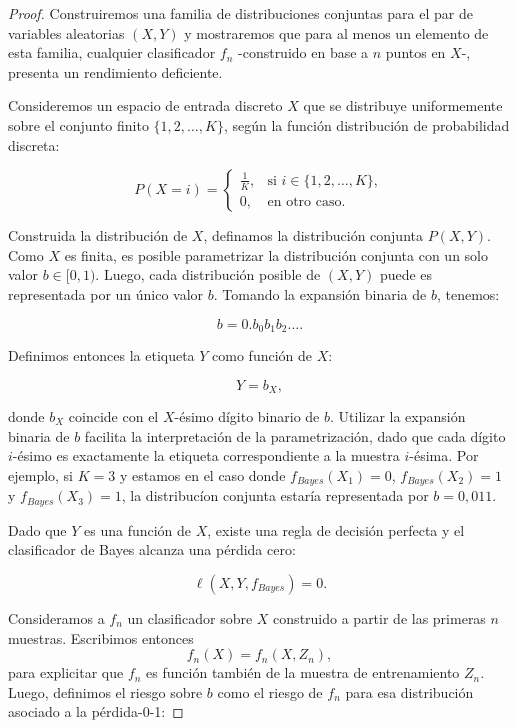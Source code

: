 \documentclass{report}
\begin{document}
\begin{proof}

Construiremos una familia de distribuciones conjuntas para el par de variables aleatorias \((X, Y)\) y mostraremos que para al menos un 
elemento de esta familia, cualquier clasificador \(f_n\) -construido en base a $n$ puntos en $X$-, presenta un rendimiento deficiente.\newline

Consideremos un espacio de entrada 
discreto \(X\) que se distribuye uniformemente sobre el conjunto finito \(\{1, 2, \dots, K\}\), 
según la función distribución de probabilidad discreta:

\[
P(X = i) = \begin{cases} 
\frac{1}{K}, & \text{si } i \in \{1, 2, \dots, K\}, \\ 
0, & \text{en otro caso}.
\end{cases}
\]


Construida la distribución de \(X\), definamos la distribución conjunta \(P(X,Y)\). Como \(X\) es finita,
es posible parametrizar la distribución conjunta con un solo valor
\(b \in [0,1)\). Luego, cada distribución posible de $(X,Y)$ puede es representada por un único valor \(b\).
Tomando la expansión binaria de $b$, tenemos:

\[
b = 0.b_0 b_1 b_2 \dots.
\]

Definimos entonces la etiqueta \(Y\) como función de \(X\):

\[
Y = b_X,
\]

donde \(b_X\) coincide con el \(X\)-ésimo dígito binario de \(b\). Utilizar la expansión binaria de $b$ facilita la interpretación
de la parametrización, dado que cada dígito $i$-ésimo es exactamente la etiqueta correspondiente a la muestra $i$-ésima.
Por ejemplo, si \(K=3\) y estamos en el caso donde  \(f_{Bayes}(X_1)=0\),  \(f_{Bayes}(X_2)=1\) y \(f_{Bayes}(X_3)=1\), 
la distribucíon conjunta estaría representada por $b=0,011$.\newline


Dado que \(Y\) es una función de \(X\), existe una regla de decisión perfecta y el clasificador de Bayes alcanza una pérdida cero:

\[
\ell(X,Y,f_{Bayes}) = 0.
\]

Consideramos a $f_n$ un clasificador sobre $X$ construido a partir de las primeras $n$ muestras. Escribimos entonces
\[
f_n(X) = f_n(X, Z_n),
\]
para explicitar que $f_n$ es función también de la muestra de entrenamiento $Z_n$. Luego, definimos el riesgo sobre \(b\)
como el riesgo de $f_n$ para esa distribución asociado a la pérdida-0-1:



\end{proof}
\end{document}
